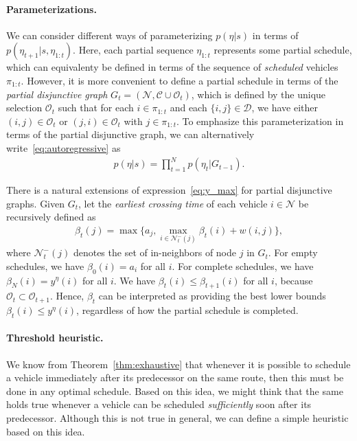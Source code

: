 \documentclass[a4paper]{report}
\theoremstyle{definition}
\theoremstyle{plain}
\begin{document}
\paragraph{Parameterizations.}
We can consider different ways of parameterizing $p(\eta | s)$ in terms of
$p(\eta_{t+1} | s, \eta_{1:t})$. Here, each partial sequence $\eta_{1:t}$
represents some partial schedule, which can equivalenty be defined in terms of
the sequence of \textit{scheduled} vehicles $\pi_{1:t}$. However, it is more
convenient to define a partial schedule in terms of the \textit{partial
  disjunctive graph} $G_{t} = (\mathcal{N}, \mathcal{C} \cup \mathcal{O}_{t})$,
which is defined by the unique selection $\mathcal{O}_{t}$ such that for each
$i \in \pi_{1:t}$ and each $\{i, j\} \in \mathcal{D}$, we have either
$(i, j) \in \mathcal{O}_{t}$ or $(j, i) \in \mathcal{O}_{t}$ with
$j \in \pi_{1:t}$.
%
To emphasize this parameterization in terms of the partial disjunctive graph, we
can alternatively write~\eqref{eq:autoregressive} as
\begin{align*}
  p(\eta | s) = \prod_{t=1}^{N} p(\eta_{t} | G_{t-1}) .
\end{align*}

There is a natural extensions of expression~\eqref{eq:y_max} for partial
disjunctive graphs. Given $G_{t}$, let the \textit{earliest crossing time} of
each vehicle $i \in \mathcal{N}$ be recursively defined as
\begin{align*}
  \beta_{t}(j) = \max\{ a_{j}, \max_{i \in \mathcal{N}^{-}_{t}(j)} \beta_{t}(i) + w(i,j) \} ,
\end{align*}
where $\mathcal{N}^{-}_{t}(j)$ denotes the set of in-neighbors of node $j$ in
$G_{t}$.
%
For empty schedules, we have $\beta_{0}(i) = a_{i}$ for all $i$. For complete
schedules, we have $\beta_{N}(i) = y^{\eta}(i)$ for all $i$. We have
$\beta_{t}(i) \leq \beta_{t+1}(i)$ for all $i$, because
$\mathcal{O}_{t} \subset \mathcal{O}_{t+1}$. Hence, $\beta_{t}$ can be
interpreted as providing the best lower bounds $\beta_{t}(i) \leq y^{\eta}(i)$,
regardless of how the partial schedule is completed.

\paragraph{Threshold heuristic.}

We know from Theorem~\ref{thm:exhaustive} that whenever it is possible to schedule a vehicle
immediately after its predecessor on the same route, then this must be done in
any optimal schedule.
%
Based on this idea, we might think that the same holds true whenever a vehicle
can be scheduled \textit{sufficiently} soon after its predecessor. Although this is not
true in general, we can define a simple heuristic based on this idea.
\end{document}
